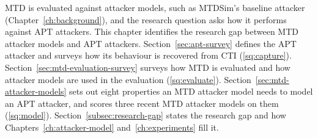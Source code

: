 \documentclass{cshonours}
\begin{document}
MTD is evaluated against attacker models, such as MTDSim's baseline
attacker (Chapter~\ref{ch:background}), and the research question asks how
it performs against APT attackers. This chapter identifies the research gap
between MTD attacker models and APT attackers. Section~\ref{sec:apt-survey} defines the
APT attacker and surveys how its behaviour is recovered from CTI
(\ref{sq:capture}). Section~\ref{sec:mtd-evaluation-survey} surveys how MTD
is evaluated and how attacker models are used in the evaluation
(\ref{sq:evaluate}). %
Section~\ref{sec:mtd-attacker-models} sets out eight properties an MTD
attacker model needs to model an APT attacker, and scores three recent MTD
attacker models on them (\ref{sq:model}). Section~\ref{subsec:research-gap}
states the research gap and how Chapters~\ref{ch:attacker-model}
and~\ref{ch:experiments} fill it.
\end{document}
